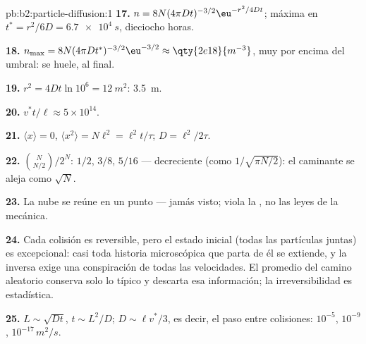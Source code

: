 \begin{solution}{pb:b2:particle-diffusion:1}
\textbf{17.} $n = 8N(4\pi Dt)^{-3/2}\eu^{-r^2/4Dt}$; máxima en $t^* = r^2/6D =
\qty{6.7e4}{s}$, dieciocho horas.

\textbf{18.} $n_{\max} = 8N(4\pi Dt^*)^{-3/2}\eu^{-3/2} \approx \qty{2e18}{m^{-3}}$,
muy por encima del umbral: se huele, al final.

\textbf{19.} $r^2 = 4Dt\ln 10^6 = \qty{12}{m^2}$: \qty{3.5}{m}.

\textbf{20.} $v^*t/\ell \approx 5 \times 10^{14}$.

\textbf{21.} $\langle x\rangle = 0$, $\langle x^2\rangle = N\ell^2 = \ell^2 t/\tau$;
$D = \ell^2/2\tau$.

\textbf{22.} $\binom{N}{N/2}/2^N$: $1/2$, $3/8$, $5/16$ --- decreciente
(como $1/\sqrt{\pi N/2}$): el caminante se aleja como $\sqrt N$.

\textbf{23.} La nube se reúne en un punto --- jamás visto; viola
la , no las leyes de la mecánica.

\textbf{24.} Cada colisión es reversible, pero el estado inicial (todas las
partículas juntas) es excepcional: casi toda historia microscópica
que parta de él se extiende, y la inversa exige una conspiración de todas las
velocidades. El promedio del camino aleatorio conserva solo lo típico y
descarta esa información; la irreversibilidad es estadística.

\textbf{25.} $L \sim \sqrt{Dt}$, $t \sim L^2/D$; $D \sim \ell v^*/3$, es decir,
el paso entre colisiones: $10^{-5}$, $10^{-9}$, $10^{-17}\,\unit{m^2/s}$.
\end{solution}

